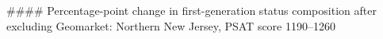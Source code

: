 #### Percentage-point change in first-generation status composition after excluding Geomarket: Northern New Jersey, PSAT score 1190–1260
